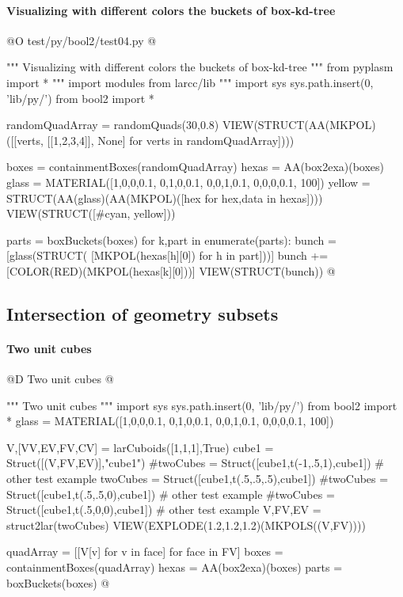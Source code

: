 \documentclass[11pt,oneside]{article}    %
\begin{document}
\paragraph{Visualizing with different colors the buckets of box-kd-tree}
@O test/py/bool2/test04.py @{
""" Visualizing with different colors the buckets of box-kd-tree """
from pyplasm import *
""" import modules from larcc/lib """
import sys
sys.path.insert(0, 'lib/py/')
from bool2 import *

randomQuadArray = randomQuads(30,0.8)
VIEW(STRUCT(AA(MKPOL)([[verts, [[1,2,3,4]], None] for verts in randomQuadArray])))

boxes = containmentBoxes(randomQuadArray)
hexas = AA(box2exa)(boxes)
glass = MATERIAL([1,0,0,0.1,  0,1,0,0.1,  0,0,1,0.1, 0,0,0,0.1, 100])
yellow = STRUCT(AA(glass)(AA(MKPOL)([hex for hex,data in hexas])))
VIEW(STRUCT([#cyan,
    yellow]))

parts = boxBuckets(boxes)
for k,part in enumerate(parts):
    bunch = [glass(STRUCT( [MKPOL(hexas[h][0]) for h in part]))]
    bunch += [COLOR(RED)(MKPOL(hexas[k][0]))]
    VIEW(STRUCT(bunch))
@}


\subsection{Intersection of geometry subsets}


\paragraph{Two unit cubes}
@D Two unit cubes
@{""" Two unit cubes """
import sys
sys.path.insert(0, 'lib/py/')
from bool2 import *
glass = MATERIAL([1,0,0,0.1,  0,1,0,0.1,  0,0,1,0.1, 0,0,0,0.1, 100])

V,[VV,EV,FV,CV] = larCuboids([1,1,1],True)
cube1 = Struct([(V,FV,EV)],"cube1")
#twoCubes = Struct([cube1,t(-1,.5,1),cube1])     # other test example
twoCubes = Struct([cube1,t(.5,.5,.5),cube1])
#twoCubes = Struct([cube1,t(.5,.5,0),cube1])    # other test example
#twoCubes = Struct([cube1,t(.5,0,0),cube1])        # other test example
V,FV,EV = struct2lar(twoCubes)
VIEW(EXPLODE(1.2,1.2,1.2)(MKPOLS((V,FV))))

quadArray = [[V[v] for v in face] for face in FV]
boxes = containmentBoxes(quadArray)
hexas = AA(box2exa)(boxes)
parts = boxBuckets(boxes)
@}
\end{document}
